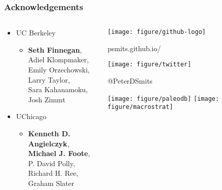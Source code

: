 \documentclass{beamer}
\begin{document}
\begin{frame}
  \frametitle{Acknowledgements}
  \begin{columns}
    \begin{column}{0.5\textwidth}
      \begin{itemize}
        \item UC Berkeley
          \begin{itemize}
            \item \textbf{Seth Finnegan}, \\Adiel Klompmaker, \\Emily Orzechowski, \\Larry Taylor, \\Sara Kahanamoku, \\Josh Zimmt
          \end{itemize}
        \item UChicago
          \begin{itemize}
            \item \textbf{Kenneth D. Angielczyk}, \\\textbf{Michael J. Foote}, \\P. David Polly, \\Richard H. Ree, \\Graham Slater
          \end{itemize}
      \end{itemize}
    \end{column}
    \begin{column}{0.5\textwidth}
      \begin{center}
        \texttt{[image: figure/github-logo]}

        \tiny{psmits.github.io/}
      \end{center}
      \vspace*{0.02\textheight}
      \begin{center}
        \texttt{[image: figure/twitter]} 

        \tiny{@PeterDSmits}
      \end{center}
      \vspace*{0.01\textheight}
      \begin{center}
        \texttt{[image: figure/paleodb]}
        \texttt{[image: figure/macrostrat]}
      \end{center}
    \end{column}
  \end{columns}
\end{frame}
\end{document}
